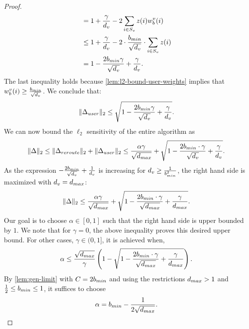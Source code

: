 \begin{proof}
\begin{align*}
    &=  1  + \frac{\gamma}{d_v}  -  2\sum_{i \in S_v} z(i) w_b^v(i) \\
    &\leq  1  + \frac{\gamma}{d_v}  -  2 \cdot \frac{b_{min}}{\sqrt{d_v}} \cdot \sum_{i \in S_v} z(i)  \\
    &= 1 - \frac{2 b_{min} \gamma}{\sqrt{d_v}} + \frac{\gamma}{d_v}.
\end{align*}
The last inequality holds because   \cref{lem:l2-bound-user-weights} implies that 
$w_b^v(i) \geq \frac{b_{min}}{\sqrt{d_v}}$. We conclude that: 
\[
\|\Delta_{user}\|_2 \leq \sqrt{1 - \frac{2 b_{min} \gamma}{\sqrt{d_v}} + \frac{\gamma}{d_v}}.
\]
We can now bound the $\ell_2$ sensitivity of the entire algorithm as
\begin{equation*}
    \|\Delta\|_2 \leq \|\Delta_{reroute}\|_2 + \|\Delta_{user}\|_2 \leq 
    \frac{\alpha \gamma}{\sqrt{d_{max}}} + \sqrt{1 - \frac{2 b_{min} \cdot \gamma}{\sqrt{d_v}} + \frac{\gamma}{d_v}}.
\end{equation*}
As the expression $-\frac{2 b_{min}}{\sqrt{d_v}} + \frac{1}{d_v}$ is increasing for $d_v \geq \frac{1}{b_{min}^2}$, the right hand side is maximized with $d_v = d_{max}$:
\begin{equation*}
    \|\Delta\|_2 \leq \frac{\alpha \gamma}{\sqrt{d_{max}}} + \sqrt{1 - \frac{2 b_{min} \cdot \gamma}{\sqrt{d_{max}}} + \frac{\gamma}{d_{max}}}.
\end{equation*}
Our goal is to choose $\alpha \in [0,1]$ such that the right hand side is upper bounded by $1$.
We note that for $\gamma = 0$, the above inequality proves this desired upper bound.
For other cases, $\gamma \in (0,1]$, it is achieved when,
\begin{equation}
    \alpha \leq \frac{\sqrt{d_{max}}}{\gamma} \left(1 - \sqrt{1 - \frac{2 b_{min} \cdot \gamma}{\sqrt{d_{max}}} + \frac{\gamma}{d_{max}}} \right).
\end{equation}
By \cref{lem:gen-limit} with $C=2 b_{min}$ and using the restrictions $d_{max} > 1$ and $\frac{1}{2} \leq b_{min} \leq 1$, it suffices to choose
\begin{equation}\label{eq:alpha}
    \alpha = b_{min} - \frac{1}{2\sqrt{d_{max}}}.
\end{equation}
\end{proof}

